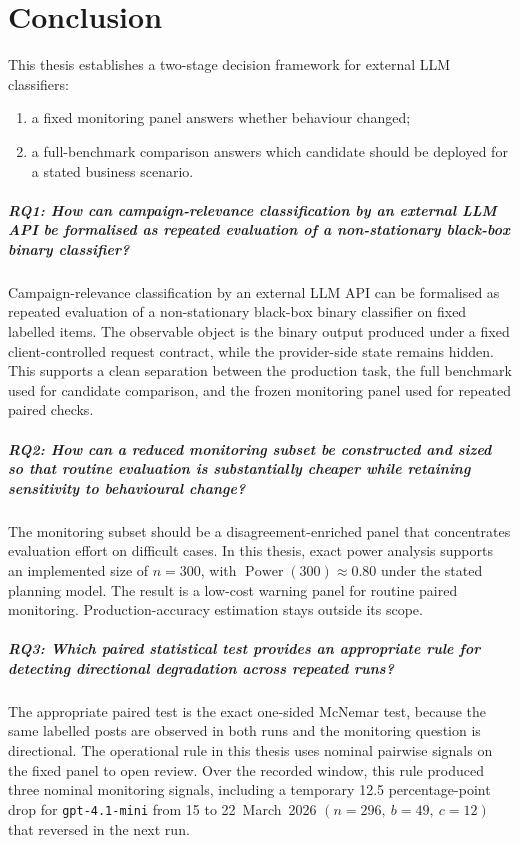 \chapter{Conclusion}
\label{chap:conclusion}

This thesis establishes a two-stage decision framework for external LLM
classifiers:
\begin{enumerate}
    \item a fixed monitoring panel answers whether behaviour changed;
    \item a full-benchmark comparison answers which candidate should be deployed
    for a stated business scenario.
\end{enumerate}

\paragraph{RQ1: How can campaign-relevance classification by an external LLM API
be formalised as repeated evaluation of a non-stationary black-box binary
classifier?}
Campaign-relevance classification by an external LLM API can be formalised as
repeated evaluation of a non-stationary black-box binary classifier on fixed
labelled items. The observable object is the binary output produced under a
fixed client-controlled request contract, while the provider-side state remains
hidden.
This supports a clean separation between the production task, the full
benchmark used for candidate comparison, and the frozen monitoring panel used
for repeated paired checks.

\paragraph{RQ2: How can a reduced monitoring subset be constructed and sized so
that routine evaluation is substantially cheaper while retaining sensitivity to
behavioural change?}
The monitoring subset should be a disagreement-enriched panel that
concentrates evaluation effort on difficult cases. In this thesis, exact power
analysis supports an implemented size of \(n=300\), with
\(\operatorname{Power}(300)\approx 0.80\) under the stated planning model.
The result is a low-cost warning panel for routine paired monitoring.
Production-accuracy estimation stays outside its scope.

\paragraph{RQ3: Which paired statistical test provides an appropriate rule for
detecting directional degradation across repeated runs?}
The appropriate paired test is the exact one-sided McNemar test, because the
same labelled posts are observed in both runs and the monitoring question is
directional.
The operational rule in this thesis uses nominal pairwise signals
on the fixed panel to open review. Over the recorded window, this rule
produced three nominal monitoring signals, including a temporary 12.5
percentage-point drop for \texttt{gpt-4.1-mini} from 15 to 22~March~2026
\((n=296,\ b=49,\ c=12)\) that reversed in the next run.

